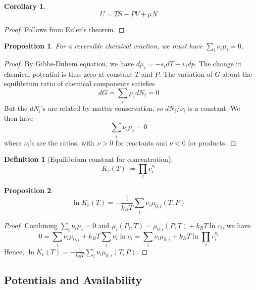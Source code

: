 \documentclass[a4paper]{article}
\theoremstyle{new}
\newtheorem{defi}{Definition}[section]
\newtheorem{prop}{Proposition}[section]
\newtheorem{cor}{Corollary}[section]
\begin{document}
\begin{cor}
$$U=TS-PV+\mu N$$
\end{cor}
\begin{proof}
Follows from Euler's theorem.
\end{proof}
\begin{prop}
For a reversible chemical reaction, we must have $\sum_i\nu_i\mu_i=0$.
\end{prop}
\begin{proof}
By Gibbs-Duhem equation, we have $d\mu_i=-s_idT+v_idp$. The change in chemical potential is thus zero at constant $T$ and $P$. The variation of $G$ about the equilibrium ratio of chemical components satisfies
$$dG=\sum_i\mu_idN_i=0$$
But the $dN_i$'s are related by matter conservation, so $dN_i/\nu_i$ is a constant. We then have 
$$\sum_i\nu_i\mu_i=0$$
where $\nu_i$'s are the ratios, with $\nu>0$ for reactants and $\nu<0$ for products. 
\end{proof}
\begin{defi}[Equilibrium constant for concentration]
$$K_c(T):=\prod_ic_i^{\nu_i}$$
\end{defi}
\begin{prop}
$$\ln K_c(T)=-\frac{1}{k_BT}\sum_i\nu_i\mu_{0,i}(T,P)$$
\end{prop}
\begin{proof}
Combining $\sum_i\nu_i\mu_i=0$ and $\mu_i(P_i,T)=\mu_{0,i}(P,T)+k_BT\ln c_i$, we have
$$0=\sum_i\nu_i\mu_{0,i}+k_BT\sum_i\nu_i\ln c_i=\sum_i\nu_i\mu_{0,i}+k_BT\ln\prod_i c_i^{\nu_i}$$
Hence, $\ln K_c(T)=-\frac{1}{k_BT}\sum_i\nu_i\mu_{0,i}(T,P)$.
\end{proof}
\newpage
\subsection{Potentials and Availability}
\end{document}
